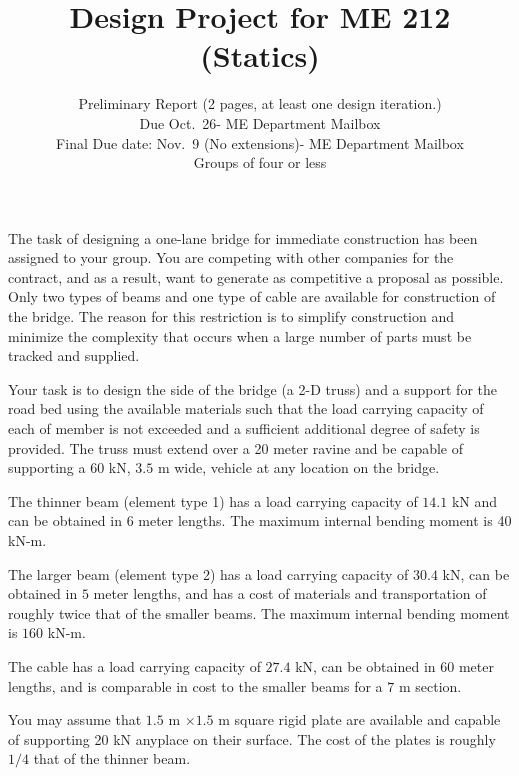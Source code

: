 \documentclass[11pt]{article}
\begin{document}
\title{
    Design Project for ME 212 (Statics)
}
\author{
   Preliminary Report (2 pages, at least one design iteration.)\\ 
   Due Oct.~26- ME Department Mailbox\\
Final Due date: Nov.~9 (No extensions)- ME Department Mailbox\\
Groups of four or less     %
}

\maketitle

The task of designing a one-lane bridge for immediate construction has been assigned to your group.  You are competing with other companies for the contract, and as a result, want to generate as competitive a proposal as possible.  Only two types of beams and one type of cable are available for construction of the bridge.  The reason for this restriction is to simplify construction and minimize the complexity that occurs when a large number of parts must be tracked and supplied. 

Your task is to design the side of the bridge (a 2-D truss) and a support for the road bed using the available materials such that the load carrying capacity of each of member is not exceeded and a sufficient additional degree of safety is provided.  The truss must extend over a 20 meter ravine and be capable of supporting a $60$ kN, $3.5$ m wide, vehicle at any location on the bridge.

The thinner beam (element type 1) has a load carrying capacity of $14.1$ kN and can be obtained in $6$ meter lengths.  The maximum internal bending moment is 40 kN-m.

The larger beam (element type 2) has a load carrying capacity of $30.4$ kN, can be obtained in $5$ meter lengths, and has a cost of materials and transportation of roughly twice that of the smaller beams.  The maximum internal bending moment is $160$ kN-m.

The cable has a load carrying capacity of $27.4$ kN, can be obtained in $60$ meter lengths, and is comparable in cost to the smaller beams for a $7$ m section.

You may assume that $1.5$ m $ \times 1.5$ m square rigid plate are available and capable of supporting 20 kN anyplace on their surface.  The cost of the plates is roughly $1/4$ that of the thinner beam.
\end{document}

